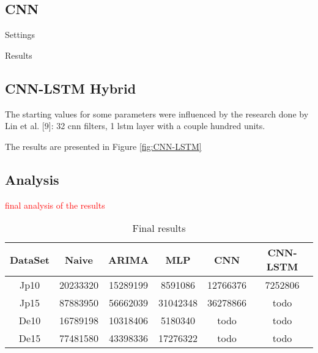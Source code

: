 \subsection{CNN}

Settings

Results
\subsection{CNN-LSTM Hybrid}

The starting values for some parameters
were influenced by the research done by Lin et al. [9]: 32 cnn filters, 1 lstm layer with a couple hundred units.

The results are presented in Figure \ref{fig:CNN-LSTM}

\subsection{Analysis}

\textcolor{red}{final analysis of the results}

 \begin{table}[htbp]
 \caption{ Final results}
 \begin{center}
 \begin{tabular}{|c|c|c|c|c|c|}
 \hline
DataSet & Naive & ARIMA & MLP & CNN & CNN-LSTM \\
\hline
Jp10& 20233320 & 15289199 & 8591086 & 12766376 & 7252806\\
\hline
Jp15 & 87883950 & 56662039 & 31042348 & 36278866 & todo\\
\hline
De10 & 16789198 & 10318406 & 5180340 & todo & todo\\
\hline
De15 & 77481580 & 43398336 & 17276322 & todo & todo\\
\hline
 \end{tabular}
 \label{tabel_LevelsOfLearningFundamental}
 \end{center}
 \end{table}